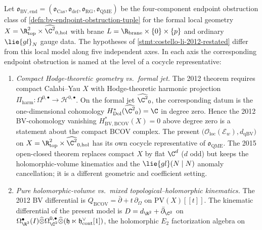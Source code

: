 \begin{prop}\label{prop:costello-li-2012-hypothesis-separation}
  Let \(\mathfrak o_{\mathrm{BV,end}}=(\mathfrak o_{\mathrm{Cas}},
  \mathfrak o_{\mathrm{def}},\mathfrak o_{\mathrm{RG}},
  \mathfrak o_{\mathrm{QME}})\) be the four-component endpoint
  obstruction class of \ref{defn:bv-endpoint-obstruction-tuple} for the
  formal local geometry
  \(X=\R^2_{\mathrm{top}}\times\widehat{\C^2}_{0,\mathrm{hol}}\) with
  brane \(L=\R_{\mathrm{brane}}\times\{0\}\times\{p\}\) and ordinary
  \(\lie{gl}_N\) gauge data.  The hypotheses of
  \ref{stmt:costello-li-2012-restated} differ from this local model
  along five independent axes.  In each axis the corresponding endpoint
  obstruction is named at the level of a cocycle representative:
  \begin{enumerate}
    \item[(S1)] \emph{Compact Hodge-theoretic geometry vs.\ formal
      jet.}  The 2012 theorem requires compact Calabi--Yau \(X\) with
      Hodge-theoretic harmonic projection
      \(\Pi_{\mathrm{harm}}\colon\Omega^{0,\bullet}\to
      \mathcal H^{0,\bullet}\).  On the formal jet
      \(\widehat{\C^2}_0\), the corresponding datum is the
      one-dimensional cohomology
      \(H^*_{\mathrm{Dol}}(\widehat{\C^2}_0)=\C\) in degree zero.
      Hence the 2012 BV-cohomology vanishing
      \(H^*_{\mathrm{BV},\mathrm{BCOV}}(X)=0\) above degree zero is a
      statement about the compact BCOV complex.  The present
	      \(\bigl(\mathcal O_{\mathrm{loc}}(\mathcal E_w),
	      d_{\mathrm{qBV}}\bigr)\)
      on \(X=\R^2_{\mathrm{top}}\times\widehat{\C^2}_{0,\mathrm{hol}}\)
      has its own cocycle representative
      of \(\mathfrak o_{\mathrm{QME}}\).  The 2015
      open-closed theorem replaces compact \(X\) by flat \(\C^d\) (\(d\)
      odd) but keeps the holomorphic-volume kinematics and the
      \(\lie{gl}(N\mid N)\) anomaly cancellation; it is a different
      geometric and coefficient setting.
    \item[(S2)] \emph{Pure holomorphic-volume vs.\ mixed
      topological--holomorphic kinematics.}  The 2012 BV differential is
      \(Q_{\mathrm{BCOV}}=\bar\partial+t\,\partial_\Omega\) on
      \(\mathrm{PV}(X)[[t]]\).  The kinematic differential of the
      present model is
      \(D=d_{\R^2}+\bar\partial_{\C^2}\) on
      \(\Omega^\bullet_{\R^2}(I)\widehat\otimes
      \Omega^{0,\bullet}_{\C^2}\widehat\otimes
      (\mathfrak h\ltimes\mathfrak h^\vee_{\mathrm{cont}}[1])\),
      the holomorphic \(E_2\) factorization algebra on

\end{enumerate}
\end{prop}
